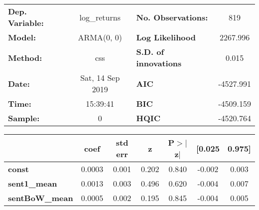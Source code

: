 \begin{center}
\begin{tabular}{lclc}
\toprule
\textbf{Dep. Variable:} &   log\_returns   & \textbf{  No. Observations:  } &    819      \\
\textbf{Model:}         &    ARMA(0, 0)    & \textbf{  Log Likelihood     } &  2267.996   \\
\textbf{Method:}        &       css        & \textbf{  S.D. of innovations} &   0.015     \\
\textbf{Date:}          & Sat, 14 Sep 2019 & \textbf{  AIC                } & -4527.991   \\
\textbf{Time:}          &     15:39:41     & \textbf{  BIC                } & -4509.159   \\
\textbf{Sample:}        &        0         & \textbf{  HQIC               } & -4520.764   \\
\bottomrule
\end{tabular}
\begin{tabular}{lcccccc}
                       & \textbf{coef} & \textbf{std err} & \textbf{z} & \textbf{P$> |$z$|$} & \textbf{[0.025} & \textbf{0.975]}  \\
\midrule
\textbf{const}         &       0.0003  &        0.001     &     0.202  &         0.840        &       -0.002    &        0.003     \\
\textbf{sent1\_mean}   &       0.0013  &        0.003     &     0.496  &         0.620        &       -0.004    &        0.007     \\
\textbf{sentBoW\_mean} &       0.0005  &        0.002     &     0.195  &         0.845        &       -0.004    &        0.005     \\
\bottomrule
\end{tabular}
\end{center}
